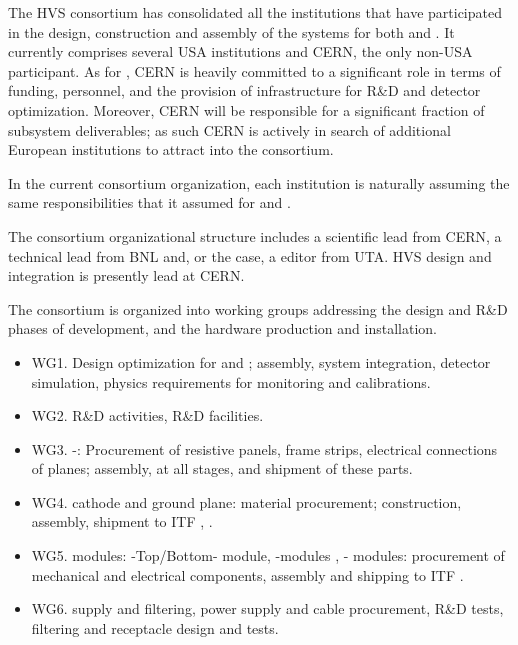 The HVS consortium has consolidated all the institutions that have participated in the design, construction and assembly of the  systems for both   and . 
%
It currently comprises several USA institutions and CERN, %
the only non-USA participant. As %
for , CERN is heavily committed to a significant role in terms of funding, personnel, 
 and the provision of infrastructure for R\&D and detector optimization. Moreover, CERN will be responsible for a significant fraction of subsystem deliverables; as such  CERN is actively in search of additional European institutions to attract into the consortium. 
 
 In the  current consortium organization, each institution is naturally assuming the same responsibilities that it assumed for %
 and .

The %
consortium organizational structure includes a scientific lead from CERN, a technical lead from BNL and, or the  case, a  editor from UTA.  HVS design and integration  is presently lead at  CERN. 

 The consortium is organized into working groups addressing the design and  R\&D phases of development, and the hardware production and installation.

\begin{itemize}
\item WG1. Design optimization for  and ; assembly, system integration, detector simulation, physics requirements for monitoring and calibrations. %
\item WG2. R\&D activities, R\&D facilities. %
\item WG3. -: Procurement of resistive panels, frame strips, electrical connections of planes; assembly,  at all stages, and shipment of these parts. %
\item WG4.  cathode and ground plane:  material procurement; construction, assembly, shipment to ITF , .%
\item WG5.  modules: -Top/Bottom- module, -\endwall modules , - modules: procurement of mechanical and electrical components, assembly and shipping to ITF . %
\item WG6.  supply and filtering,  power supply and cable procurement, R\&D tests, filtering and receptacle design and tests. %
\end{itemize}

